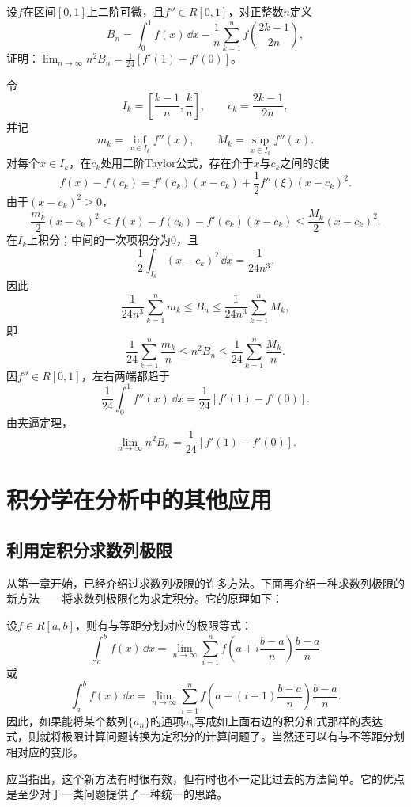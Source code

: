 \begin{xexercise}[12]
设$f$在区间$[0,1]$上二阶可微，且$f''\in R[0,1]$，对正整数$n$定义
  \[
    B_n=\int_0^1f(x)\,\dd x-\frac1n\sum_{k=1}^nf\left(\frac{2k-1}{2n}\right),
  \]
  证明：$\displaystyle\lim_{n\to\infty}n^2B_n=\frac1{24}[f'(1)-f'(0)]$。
\end{xexercise}
\begin{xsolution}
令
\[
 I_k=\left[\frac{k-1}{n},\frac kn\right],\qquad
 c_k=\frac{2k-1}{2n},
\]
并记
\[
 m_k=\inf_{x\in I_k}f''(x),\qquad
 M_k=\sup_{x\in I_k}f''(x).
\]
对每个$x\in I_k$，在$c_k$处用二阶Taylor公式，存在介于$x$与$c_k$之间的$\xi$使
\[
 f(x)-f(c_k)
 =f'(c_k)(x-c_k)+\frac12f''(\xi)(x-c_k)^2.
\]
由于$(x-c_k)^2\ge0$，
\[
 \frac{m_k}{2}(x-c_k)^2
 \le f(x)-f(c_k)-f'(c_k)(x-c_k)
 \le\frac{M_k}{2}(x-c_k)^2.
\]
在$I_k$上积分；中间的一次项积分为0，且
\[
 \frac12\int_{I_k}(x-c_k)^2\,\dd x=\frac1{24n^3}.
\]
因此
\[
 \frac1{24n^3}\sum_{k=1}^nm_k
 \le B_n
 \le\frac1{24n^3}\sum_{k=1}^nM_k,
\]
即
\[
 \frac1{24}\sum_{k=1}^n\frac{m_k}{n}
 \le n^2B_n
 \le\frac1{24}\sum_{k=1}^n\frac{M_k}{n}.
\]
因$f''\in R[0,1]$，左右两端都趋于
\[
 \frac1{24}\int_0^1f''(x)\,\dd x
 =\frac1{24}[f'(1)-f'(0)].
\]
由夹逼定理，
\[
 \boxed{\lim_{n\to\infty}n^2B_n
 =\frac1{24}[f'(1)-f'(0)]}.
\]
\end{xsolution}


\section{积分学在分析中的其他应用}

\subsection{利用定积分求数列极限}

从第一章开始，已经介绍过求数列极限的许多方法。下面再介绍一种求数列极限的新方法——将求数列极限化为求定积分。它的原理如下：

设$f\in R[a,b]$，则有与等距分划对应的极限等式：
\[
  \int_a^bf(x)\,\dd x
  =\lim_{n\to\infty}\sum_{i=1}^nf\left(a+i\frac{b-a}{n}\right)\frac{b-a}{n}
\]
或
\[
  \int_a^bf(x)\,\dd x
  =\lim_{n\to\infty}\sum_{i=1}^nf\left(a+(i-1)\frac{b-a}{n}\right)\frac{b-a}{n}.
\]
因此，如果能将某个数列$\{a_n\}$的通项$a_n$写成如上面右边的积分和式那样的表达式，则就将极限计算问题转换为定积分的计算问题了。当然还可以有与不等距分划相对应的变形。

应当指出，这个新方法有时很有效，但有时也不一定比过去的方法简单。它的优点是至少对于一类问题提供了一种统一的思路。

